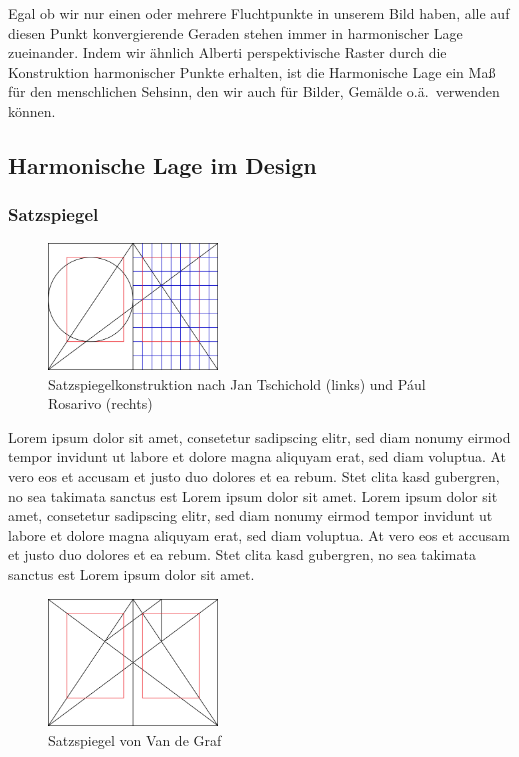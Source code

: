 \documentclass[12pt,a4paper]{article}
\begin{document}
Egal ob wir nur einen oder mehrere Fluchtpunkte in unserem Bild haben, alle auf diesen Punkt konvergierende Geraden stehen immer in harmonischer Lage zueinander. Indem wir ähnlich Alberti perspektivische Raster durch die Konstruktion harmonischer Punkte erhalten, ist die Harmonische Lage ein Maß für den menschlichen Sehsinn, den wir auch für Bilder, Gemälde o.ä.~verwenden können.

\newpage
\subsection{Harmonische Lage im Design}

\subsubsection{Satzspiegel}

\begin{figure}
\hspace{-0.025\textwidth}
\includegraphics[width=0.4\textwidth]{Bilder/page_construction.png}
\caption{Satzspiegelkonstruktion nach Jan Tschichold (links) und Pául Rosarivo (rechts)}
\label{fig:TschicholdRosarivo}
\end{figure}

Lorem ipsum dolor sit amet, consetetur sadipscing elitr, sed diam nonumy eirmod tempor invidunt ut labore et dolore magna aliquyam erat, sed diam voluptua. At vero eos et accusam et justo duo dolores et ea rebum. Stet clita kasd gubergren, no sea takimata sanctus est Lorem ipsum dolor sit amet. Lorem ipsum dolor sit amet, consetetur sadipscing elitr, sed diam nonumy eirmod tempor invidunt ut labore et dolore magna aliquyam erat, sed diam voluptua. At vero eos et accusam et justo duo dolores et ea rebum. Stet clita kasd gubergren, no sea takimata sanctus est Lorem ipsum dolor sit amet.

\begin{figure}
\hspace{-0.025\textwidth}
\includegraphics[width=0.4\textwidth]{Bilder/Van_de_Graaf_1.png}
\caption{Satzspiegel von Van de Graf}
\label{fig:VDG}
\end{figure}
\end{document}
